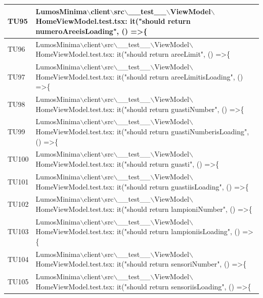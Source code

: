 \documentclass[12pt]{article}
\begin{document}
\begin{scriptsize}
\begin{xltabular}{\linewidth}{|>{\hsize}X|X|}
	TU95 & LumosMinima$\backslash$client$\backslash$src$\backslash$\_\_test\_\_$\backslash$ViewModel$\backslash$HomeViewModel.test.tsx: it("should return numeroAreeisLoading", () =\textgreater \{ \\ \hline
	TU96 & LumosMinima$\backslash$client$\backslash$src$\backslash$\_\_test\_\_$\backslash$ViewModel$\backslash$HomeViewModel.test.tsx: it("should return areeLimit", () =\textgreater \{ \\ \hline
	TU97 & LumosMinima$\backslash$client$\backslash$src$\backslash$\_\_test\_\_$\backslash$ViewModel$\backslash$HomeViewModel.test.tsx: it("should return areeLimitisLoading", () =\textgreater \{ \\ \hline
	TU98 & LumosMinima$\backslash$client$\backslash$src$\backslash$\_\_test\_\_$\backslash$ViewModel$\backslash$HomeViewModel.test.tsx: it("should return guastiNumber", () =\textgreater \{ \\ \hline
	TU99 & LumosMinima$\backslash$client$\backslash$src$\backslash$\_\_test\_\_$\backslash$ViewModel$\backslash$HomeViewModel.test.tsx: it("should return guastiNumberisLoading", () =\textgreater \{ \\ \hline
	TU100 & LumosMinima$\backslash$client$\backslash$src$\backslash$\_\_test\_\_$\backslash$ViewModel$\backslash$HomeViewModel.test.tsx: it("should return guasti", () =\textgreater \{ \\ \hline
	TU101 & LumosMinima$\backslash$client$\backslash$src$\backslash$\_\_test\_\_$\backslash$ViewModel$\backslash$HomeViewModel.test.tsx: it("should return guastiisLoading", () =\textgreater \{ \\ \hline
	TU102 & LumosMinima$\backslash$client$\backslash$src$\backslash$\_\_test\_\_$\backslash$ViewModel$\backslash$HomeViewModel.test.tsx: it("should return lampioniNumber", () =\textgreater \{ \\ \hline
	TU103 & LumosMinima$\backslash$client$\backslash$src$\backslash$\_\_test\_\_$\backslash$ViewModel$\backslash$HomeViewModel.test.tsx: it("should return lampioniisLoading", () =\textgreater \{ \\ \hline
	TU104 & LumosMinima$\backslash$client$\backslash$src$\backslash$\_\_test\_\_$\backslash$ViewModel$\backslash$HomeViewModel.test.tsx: it("should return sensoriNumber", () =\textgreater \{ \\ \hline
	TU105 & LumosMinima$\backslash$client$\backslash$src$\backslash$\_\_test\_\_$\backslash$ViewModel$\backslash$HomeViewModel.test.tsx: it("should return sensoriisLoading", () =\textgreater \{ \\ \hline

\end{xltabular}
\end{scriptsize}
\end{document}

